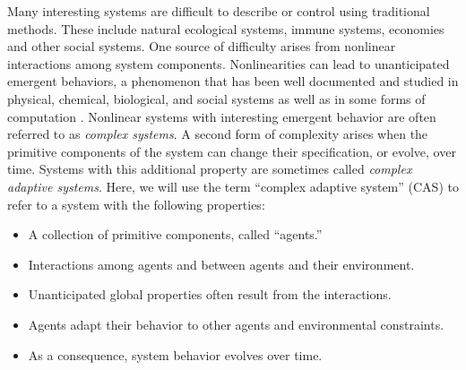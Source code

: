 Many interesting systems are difficult to describe or control using
traditional methods.  These include
natural ecological systems, immune systems, economies and other social
systems.  One source of difficulty arises from nonlinear interactions
among system components.  Nonlinearities can lead to unanticipated
emergent behaviors, a phenomenon that has been well documented and
studied in physical, chemical, biological, and social systems as well
as in some forms of computation \cite{Forrest91b}.  Nonlinear systems
with interesting emergent behavior are often referred to as {\em
complex systems}.  A second form of complexity arises when the
primitive components of the system can change their specification, or
evolve, over time.  Systems with this additional property are
sometimes called {\em complex adaptive systems}.  Here, we will use
the term ``complex adaptive system'' (CAS) to refer to a system with
the following properties:
\begin{itemize}
\item A collection of primitive components, called ``agents.''
\item Interactions among agents and between agents and their environment.
\item Unanticipated global properties often result from the interactions.
\item Agents adapt their behavior to other agents and environmental 
constraints.
\item As a consequence, system behavior evolves over time.
\end{itemize}


